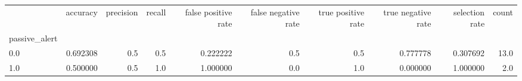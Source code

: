 \begin{tabular}{lrrrrrrrrr}
\toprule
{} &  accuracy &  precision &  recall &  false positive rate &  false negative rate &  true positive rate &  true negative rate &  selection rate &  count \\
passive\_alert &           &            &         &                      &                      &                     &                     &                 &        \\
\midrule
0.0           &  0.692308 &        0.5 &     0.5 &             0.222222 &                  0.5 &                 0.5 &            0.777778 &        0.307692 &   13.0 \\
1.0           &  0.500000 &        0.5 &     1.0 &             1.000000 &                  0.0 &                 1.0 &            0.000000 &        1.000000 &    2.0 \\
\bottomrule
\end{tabular}
